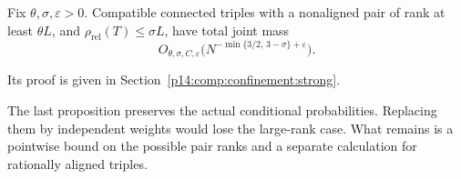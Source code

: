 \begin{proposition}
\label{p13:conf:strong-profile}
Fix \(\theta,\sigma,\varepsilon>0\).
Compatible connected triples with a nonaligned pair
of rank at least \(\theta L\), and
\(\rho_{\mathrm{rel}}(T)\le\sigma L\), have total
joint mass
\[
 O_{\theta,\sigma,C,\varepsilon}
       \bigl(N^{-\min\{3/2,\,3-\sigma\}+\varepsilon}\bigr).
\]
\end{proposition}

Its proof is given in Section~\ref{p14:comp:confinement:strong}.



The last proposition preserves the actual conditional
probabilities. Replacing them by independent weights
would lose the large-rank case. What remains is a
pointwise bound on the possible pair ranks and a separate
calculation for rationally aligned triples.
